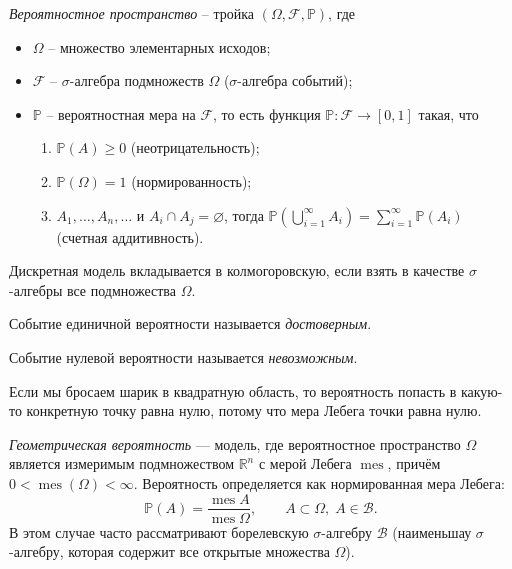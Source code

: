 \documentclass[12pt,a4paper]{article}
\begin{document}
\begin{definition}
    \textit{Вероятностное пространство} -- тройка $\left( \Omega, \mathcal{F}, \mathbb{P} \right)$, где \begin{itemize}
        \item $\Omega$ -- множество элементарных исходов;
        \item $\mathcal{F}$ -- $\sigma$-алгебра подмножеств $\Omega$ ($\sigma$-алгебра событий);
        \item $\mathbb{P}$ -- вероятностная мера на $\mathcal{F}$, то есть функция $\mathbb{P} : \mathcal{F} \to [0, 1]$ такая, что \begin{enumerate}
        \item $\mathbb{P}(A) \geq 0$ (неотрицательность);
        \item $\mathbb{P}(\Omega) = 1$ (нормированность);
        \item $A_1, \ldots, A_n, \ldots \text{ и } A_i \cap A_j = \varnothing$, тогда $\mathbb{P}\left( \bigcup\limits_{i = 1}^{\infty} A_i \right) = \sum\limits_{i=1}^{\infty} \mathbb{P}(A_i)$ (счетная аддитивность).
    \end{enumerate}
    \end{itemize} 
\end{definition}

\begin{remark}
    Дискретная модель вкладывается в колмогоровскую, если взять в качестве $\sigma$-алгебры все подмножества $\Omega$.
\end{remark}

\begin{definition}
    Событие единичной вероятности называется \textit{достоверным}.
\end{definition}

\begin{definition}
    Событие нулевой вероятности называется \textit{невозможным}.
\end{definition}

\begin{example}
    Если мы бросаем шарик в квадратную область, то вероятность попасть в какую-то конкретную точку равна нулю, потому что мера Лебега точки равна нулю.
\end{example}

\begin{definition}
    \textit{Геометрическая вероятность} — модель, где вероятностное пространство $\Omega$ является измеримым подмножеством $\mathbb{R}^n$ с мерой Лебега $\operatorname{mes}$, причём $0 < \operatorname{mes}(\Omega) < \infty$. Вероятность определяется как нормированная мера Лебега: $$\mathbb{P}(A) = \frac{\operatorname{mes}A}{\operatorname{mes}\Omega}, \qquad A \subset \Omega, \; A \in \mathcal{B}.$$ В этом случае часто рассматривают борелевскую $\sigma$-алгебру $\mathcal{B}$ (наименьшау $\sigma$-алгебру, которая содержит все открытые множества $\Omega$). 
\end{definition}
\end{document}

